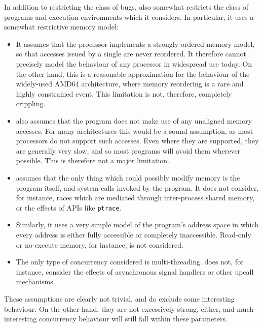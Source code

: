 In addition to restricting the class of bugs, {\technique} also
somewhat restricts the class of programs and execution environments
which it considers.  In particular, it uses a somewhat restrictive
memory model:

\begin{itemize}
\item It assumes that the processor implements a strongly-ordered
  memory model, so that accesses issued by a single are never
  reordered.  It therefore cannot precisely model the behaviour of any
  processor in widespread use today.  On the other hand, this is a
  reasonable approximation for the behaviour of the widely-used AMD64
  architecture\needCite{}, where memory reordering is a rare and
  highly constrained event.  This limitation is not, therefore,
  completely crippling.

\item {\Technique} also assumes that the program does not make use of
  any unaligned memory accesses.  For many architectures this would be
  a sound assumption, as most processors do not support such accesses.
  Even where they are supported, they are generally very slow, and so
  most programs will avoid them wherever possible.  This is therefore
  not a major limitation.

\item {\Technique} assumes that the only thing which could possibly
  modify memory is the program itself, and system calls invoked by the
  program.  It does not consider, for instance, races which are
  mediated through inter-process shared memory, or the effects of APIs
  like \texttt{ptrace}.

\item Similarly, it uses a very simple model of the program's address
  space in which every address is either fully accessible or
  completely inaccessible.  Read-only or no-execute memory\needCite{},
  for instance, is not considered.

\item The only type of concurrency considered is multi-threading.
  {\Technique} does not, for instance, consider the effects of
  asynchronous signal handlers or other upcall mechanisms.
\end{itemize}

These assumptions are clearly not trivial, and do exclude some
interesting behaviour.  On the other hand, they are not excessively
strong, either, and much interesting concurrency behaviour will still
fall within these parameters.

